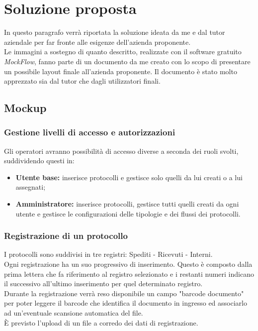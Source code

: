 

\section{Soluzione proposta}
In questo paragrafo verrà riportata la soluzione ideata da me e dal tutor aziendale per far fronte alle esigenze dell'azienda proponente.
\\
Le immagini a sostegno di quanto descritto, realizzate con il software gratuito \emph{MockFlow}\glsfirstoccur, fanno parte di un documento da me creato con lo scopo di presentare un possibile layout finale all'azienda proponente. Il documento è stato molto apprezzato sia dal tutor che dagli utilizzatori finali.
\subsection{Mockup}

\subsubsection{Gestione livelli di accesso e autorizzazioni}
Gli operatori avranno possibilità di accesso diverse a seconda dei ruoli svolti, suddividendo questi in:
    \begin{itemize}
        \item \textbf{Utente base:} inserisce protocolli e gestisce solo quelli da lui creati o a lui assegnati;
        
        \item \textbf{Amministratore:} inserisce protocolli, gestisce tutti quelli creati da ogni utente e gestisce le configurazioni delle tipologie e dei flussi dei protocolli. 
    \end{itemize}

\subsubsection{Registrazione di un protocollo}
I protocolli sono suddivisi in tre registri: Spediti - Ricevuti - Interni.
\\
Ogni registrazione ha un suo progressivo di inserimento. Questo è composto dalla prima lettera che fa riferimento al registro selezionato e i restanti numeri indicano il successivo all'ultimo inserimento per quel determinato registro.
\\
Durante la registrazione verrà reso disponibile un campo "barcode documento" per poter leggere il barcode che identifica il documento in ingresso ed associarlo ad un'eventuale scansione automatica del file.
\\
È previsto l'upload di un file a corredo dei dati di registrazione.

